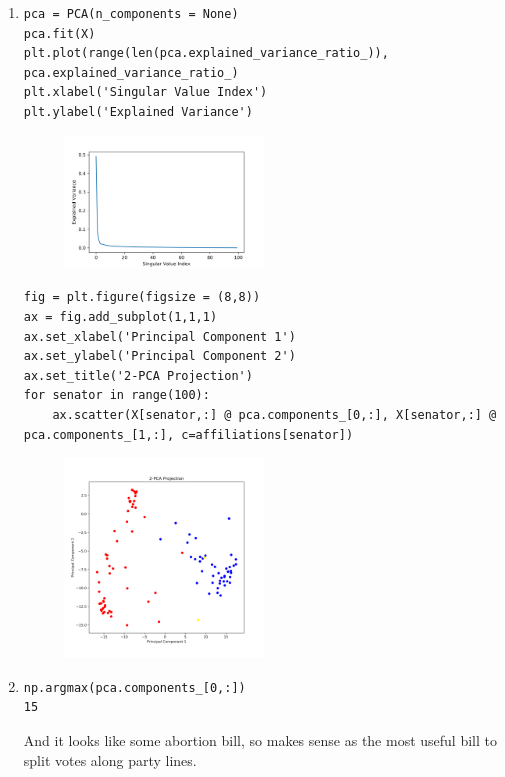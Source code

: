 \documentclass[11pt]{article}
\begin{document}
\begin{solution}
\begin{enumerate}
\item
\begin{verbatim}
pca = PCA(n_components = None)
pca.fit(X)
plt.plot(range(len(pca.explained_variance_ratio_)), pca.explained_variance_ratio_)
plt.xlabel('Singular Value Index')
plt.ylabel('Explained Variance')
\end{verbatim}
\begin{figure}[H]
    \centerline{\includegraphics[width=0.5\textwidth]{figs/explained_variance.png}}
\end{figure}

\begin{verbatim}
fig = plt.figure(figsize = (8,8))
ax = fig.add_subplot(1,1,1)
ax.set_xlabel('Principal Component 1')
ax.set_ylabel('Principal Component 2')
ax.set_title('2-PCA Projection')
for senator in range(100):
    ax.scatter(X[senator,:] @ pca.components_[0,:], X[senator,:] @ pca.components_[1,:], c=affiliations[senator])
\end{verbatim}
\begin{figure}[H]
    \centerline{\includegraphics[width=0.5\textwidth]{figs/pca_projection.png}}
\end{figure}

\item
\begin{verbatim}
np.argmax(pca.components_[0,:])
15
\end{verbatim}
And it looks like some abortion bill, so makes sense as the most useful bill to split votes along party lines.


\end{enumerate}
\end{solution}
\end{document}

